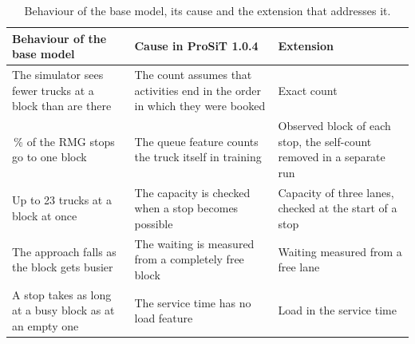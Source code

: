 \begin{table}[htbp]
\centering
\footnotesize
\setlength{\tabcolsep}{4pt}
\begin{tabularx}{\textwidth}{YYY}
\toprule
\textbf{Behaviour of the base model} & \textbf{Cause in ProSiT 1.0.4} & \textbf{Extension} \\
\midrule
The simulator sees fewer trucks at a block than are there & The count assumes that activities end in the order in which they were booked & Exact count \\
\,\% of the RMG stops go to one block & The queue feature counts the truck itself in training & Observed block of each stop, the self-count removed in a separate run \\
\addlinespace
Up to 23 trucks at a block at once & The capacity is checked when a stop becomes possible & Capacity of three lanes, checked at the start of a stop \\
\addlinespace
The approach falls as the block gets busier & The waiting is measured from a completely free block & Waiting measured from a free lane \\
\addlinespace
A stop takes as long at a busy block as at an empty one & The service time has no load feature & Load in the service time \\
\bottomrule
\end{tabularx}
\caption{Behaviour of the base model, its cause and the extension that addresses it.}
\label{tab:rq2_causes}
\end{table}
